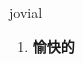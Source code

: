 
\begin{frame}
{\huge jovial}
\begin{center}
\begin{enumerate}\Large
  \item \textbf{愉快的}
\end{enumerate}
\end{center}
\end{frame}
